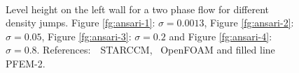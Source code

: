   \begin{figure}[h]
  \centering
     \\
   \caption{Level height on the left wall for a two phase flow for different density jumps. Figure \ref{fg:ansari-1}: $\sigma=0.0013$, Figure \ref{fg:ansari-2}: $\sigma=0.05$, Figure \ref{fg:ansari-3}: $\sigma=0.2$ and Figure \ref{fg:ansari-4}: $\sigma=0.8$. References:\ \Circle \ STARCCM, \Square \ OpenFOAM and filled line PFEM-2.}
   \label{fg:ansari-results}                %
\end{figure}

